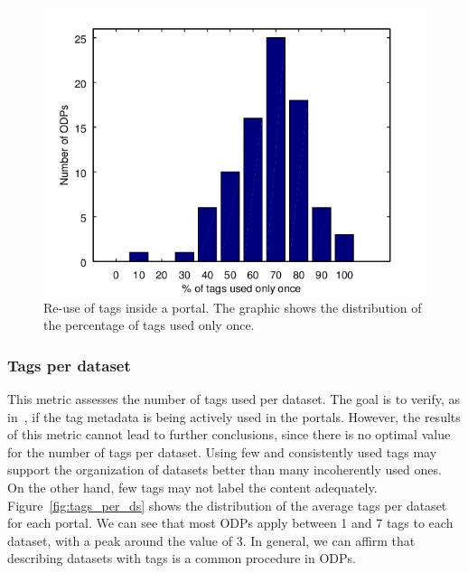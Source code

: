 
\begin{figure}[tb]
\begin{center}
\includegraphics[scale=1.2]{images/tag_once_dist.png}
\caption{Re-use of tags inside a portal. The graphic shows the distribution of the percentage of tags used only once.}
\label{fig:tags_once}
\end{center}
\end{figure}

\subsubsection{Tags per dataset}
This metric assesses the number of tags used per dataset.
The goal is to verify, as in~\cite{Umbrich2015}, if the tag metadata is being actively used in the portals.
However, the results of this metric cannot lead to further conclusions, since there is no optimal value for the number of tags per dataset. 
Using few and consistently used tags may support the organization of datasets better than many incoherently used ones.
On the other hand, few tags may not label the content adequately.
Figure~\ref{fig:tags_per_ds} shows the distribution of the average tags per dataset for each portal. 
We can see that most ODPs apply between 1 and 7 tags to each dataset, with a peak around the value of 3.
In general, we can affirm that describing datasets with tags is a common procedure in ODPs.


